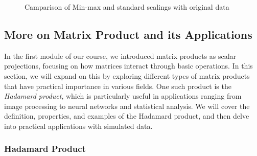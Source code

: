 \documentclass[
  letterpaper,
  DIV=11,
  numbers=noendperiod]{scrreprt}
\theoremstyle{plain}
\theoremstyle{definition}
\theoremstyle{remark}
\begin{document}
\begin{figure}[H]


\caption{\label{fig-comp2}Camparison of Min-max and standard scalings
with original data}

\end{figure}%

\subsection{More on Matrix Product and its
Applications}\label{more-on-matrix-product-and-its-applications}

In the first module of our course, we introduced matrix products as
scalar projections, focusing on how matrices interact through basic
operations. In this section, we will expand on this by exploring
different types of matrix products that have practical importance in
various fields. One such product is the \emph{Hadamard product}, which
is particularly useful in applications ranging from image processing to
neural networks and statistical analysis. We will cover the definition,
properties, and examples of the Hadamard product, and then delve into
practical applications with simulated data.

\subsubsection{Hadamard Product}\label{hadamard-product}
\end{document}
